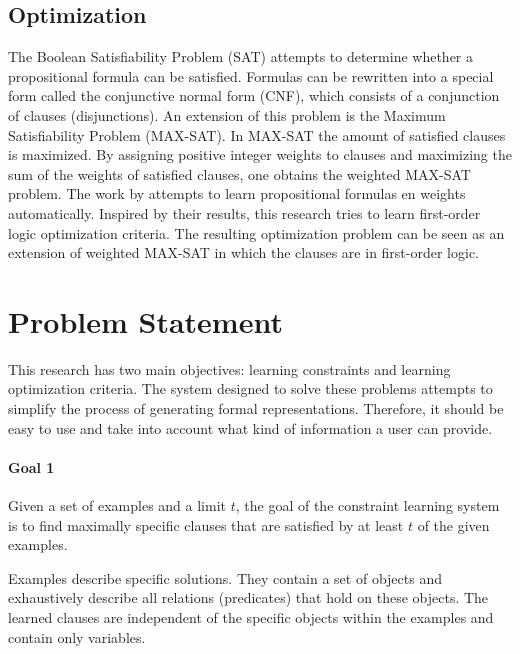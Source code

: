 \documentclass[letterpaper]{article}
\theoremstyle{definition}
\begin{document}
\subsection{Optimization}
The Boolean Satisfiability Problem (SAT) attempts to determine whether a propositional formula can be satisfied.
Formulas can be rewritten into a special form called the conjunctive normal form (CNF), which consists of a conjunction of clauses (disjunctions).
An extension of this problem is the Maximum Satisfiability Problem (MAX-SAT).
In MAX-SAT the amount of satisfied clauses is maximized.
By assigning positive integer weights to clauses and maximizing the sum of the weights of satisfied clauses, one obtains the weighted MAX-SAT problem.
The work by \cite{campigotto2011active} attempts to learn propositional formulas en weights automatically.
Inspired by their results, this research tries to learn first-order logic optimization criteria.
The resulting optimization problem can be seen as an extension of weighted MAX-SAT in which the clauses are in first-order logic.

\section{Problem Statement}
This research has two main objectives: learning constraints and learning optimization criteria.
The system designed to solve these problems attempts to simplify the process of generating formal representations.
Therefore, it should be easy to use and take into account what kind of information a user can provide.

\begin{framed}
  \noindent
  \begin{minipage}{\textwidth}
    \paragraph*{Goal 1}
    Given a set of examples and a limit $t$, the goal of the constraint learning system is to find maximally specific clauses that are satisfied by at least $t$ of the given examples.
  \end{minipage}
\end{framed}

Examples describe specific solutions.
They contain a set of objects and exhaustively describe all relations (predicates) that hold on these objects.
The learned clauses are independent of the specific objects within the examples and contain only variables.
\end{document}
